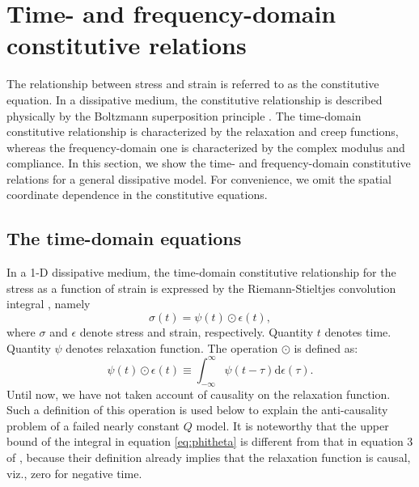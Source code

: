 \documentclass[article]{./macros/elsarticle_qh}
\begin{document}
\section{Time- and frequency-domain constitutive relations}
The relationship between stress and strain is referred to as the constitutive equation. In a dissipative medium, the constitutive relationship is described physically by the Boltzmann superposition principle \cite[]{zener:1956,lakes:2009}. The time-domain constitutive relationship is characterized by the relaxation and creep functions, whereas the frequency-domain one is characterized by the complex modulus and compliance. In this section, we show the time- and frequency-domain constitutive relations for a general dissipative model. For convenience, we omit the spatial coordinate dependence in the constitutive equations. 

\subsection{The time-domain equations}
In a 1-D dissipative medium, the time-domain constitutive relationship for the stress as a function of strain is expressed by the Riemann-Stieltjes convolution integral \cite[]{gurtin:1962,apostol:1974}, namely
\begin{equation} \label{eq:const_t1}
\sigma(t) = \psi(t) \odot \epsilon(t) ,
\end{equation}
where $\sigma$ and $\epsilon$ denote stress and strain, respectively. Quantity $t$ denotes time. Quantity $\psi$ denotes relaxation function. The operation $\odot$ is defined as:
\begin{equation} \label{eq:phitheta}
\psi(t) \odot \epsilon(t)  \equiv 
\int_{-\infty}^{\infty} \psi(t-\tau) \text{d}\epsilon(\tau) .
\end{equation}
Until now, we have not taken account of causality on the relaxation function. Such a definition of this operation is used below to explain the anti-causality problem of a failed nearly constant $Q$ model. It is noteworthy that the upper bound of the integral in equation \ref{eq:phitheta} is different from that in equation 3 of \cite{hao.alkhalifah:2019}, because their definition already implies that the relaxation function is causal, viz., zero for negative time.
\end{document}
